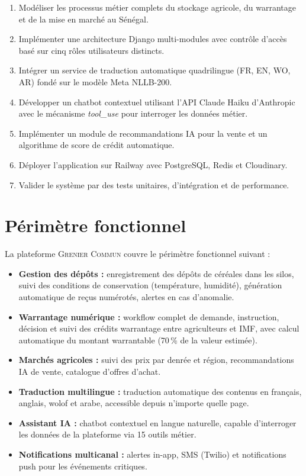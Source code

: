 \documentclass[12pt,a4paper,twoside]{report}
\newcommand{\gc}{\textsc{Grenier Commun}}
\begin{document}
\begin{enumerate}
  \item Modéliser les processus métier complets du stockage agricole, du warrantage
        et de la mise en marché au Sénégal.
  \item Implémenter une architecture Django multi-modules avec contrôle d'accès
        basé sur cinq rôles utilisateurs distincts.
  \item Intégrer un service de traduction automatique quadrilingue (FR, EN, WO, AR)
        fondé sur le modèle Meta NLLB-200.
  \item Développer un chatbot contextuel utilisant l'API Claude Haiku d'Anthropic
        avec le mécanisme \emph{tool\_use} pour interroger les données métier.
  \item Implémenter un module de recommandations IA pour la vente et un algorithme
        de score de crédit automatique.
  \item Déployer l'application sur Railway avec PostgreSQL, Redis et Cloudinary.
  \item Valider le système par des tests unitaires, d'intégration et de performance.
\end{enumerate}

\section{Périmètre fonctionnel}

La plateforme \gc{} couvre le périmètre fonctionnel suivant :

\begin{itemize}
  \item \textbf{Gestion des dépôts :} enregistrement des dépôts de céréales dans
        les silos, suivi des conditions de conservation (température, humidité),
        génération automatique de reçus numérotés, alertes en cas d'anomalie.
  \item \textbf{Warrantage numérique :} workflow complet de demande, instruction,
        décision et suivi des crédits warrantage entre agriculteurs et IMF,
        avec calcul automatique du montant warrantable (70\,\% de la valeur estimée).
  \item \textbf{Marchés agricoles :} suivi des prix par denrée et région,
        recommandations IA de vente, catalogue d'offres d'achat.
  \item \textbf{Traduction multilingue :} traduction automatique des contenus en
        français, anglais, wolof et arabe, accessible depuis n'importe quelle page.
  \item \textbf{Assistant IA :} chatbot contextuel en langue naturelle, capable
        d'interroger les données de la plateforme via 15 outils métier.
  \item \textbf{Notifications multicanal :} alertes in-app, SMS (Twilio) et
        notifications push pour les événements critiques.
\end{itemize}
\end{document}
